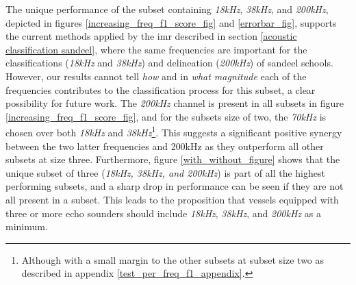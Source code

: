     The unique performance of the subset containing \textit{18kHz}, \textit{38kHz}, and \textit{200kHz}, depicted in figures \ref{increasing_freq_f1_score_fig} and \ref{errorbar_fig}, supports the current methods applied by the \gls{imr} described in section \ref{acoustic classification sandeel}, where the same frequencies are important for the classifications (\textit{18kHz} and \textit{38kHz}) and delineation (\textit{200kHz}) of sandeel schools. However, our results cannot tell \textit{how} and in \textit{what magnitude} each of the frequencies contributes to the classification process for this subset, a clear possibility for future work. The \textit{200kHz} channel is present in all subsets in figure \ref{increasing_freq_f1_score_fig}, and for the subsets size of two, the \textit{70kHz}  is chosen over both \textit{18kHz} and \textit{38kHz}\footnote{Although with a small margin to the other subsets at subset size two as described in appendix \ref{test_per_freq_f1_appendix}.}. This suggests a significant positive synergy between the two latter frequencies and 200kHz as they outperform all other subsets at size three. Furthermore, figure \ref{with_without_figure} shows that the unique subset of three (\textit{\textit{18kHz}, \textit{38kHz}, and \textit{200kHz}}) is part of all the highest performing subsets, and a sharp drop in performance can be seen if they are not all present in a subset. This leads to the proposition that vessels equipped with three or more echo sounders should include \textit{18kHz}, \textit{38kHz}, and \textit{200kHz} as a minimum. 


    
    
